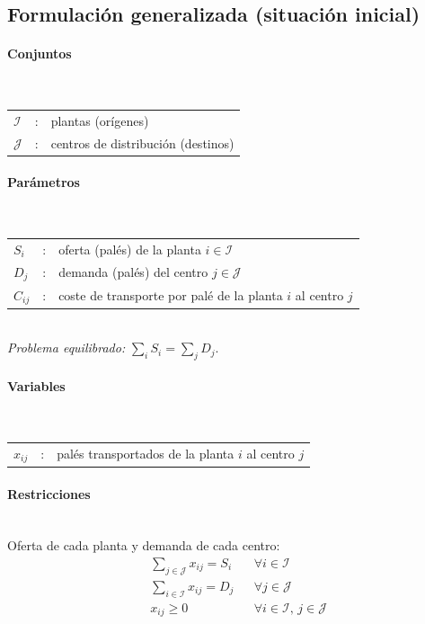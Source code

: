 \subsection{Formulación generalizada (situación inicial)}

\paragraph{Conjuntos}\mbox{}\\
\begin{tabular}{l c l}
    $\mathcal{I}$ & : & plantas (orígenes) \\
    $\mathcal{J}$ & : & centros de distribución (destinos) \\
\end{tabular}

\paragraph{Parámetros}\mbox{}\\
\begin{tabular}{l c l}
    $S_i$    & : & oferta (palés) de la planta $i \in \mathcal{I}$ \\
    $D_j$    & : & demanda (palés) del centro $j \in \mathcal{J}$ \\
    $C_{ij}$ & : & coste de transporte por palé de la planta $i$ al centro $j$ \\
\end{tabular}
\\[2pt]
\textit{Problema equilibrado: } $\sum_{i} S_i = \sum_{j} D_j$.

\paragraph{Variables}\mbox{}\\
\begin{tabular}{l c l}
    $x_{ij}$ & : & palés transportados de la planta $i$ al centro $j$ \\
\end{tabular}

\paragraph{Restricciones}\mbox{}\\
Oferta de cada planta y demanda de cada centro:
\begin{align}
    & \sum_{j \in \mathcal{J}} x_{ij} = S_i && \forall i \in \mathcal{I} \\
    & \sum_{i \in \mathcal{I}} x_{ij} = D_j && \forall j \in \mathcal{J} \\
    & x_{ij} \geq 0 && \forall i \in \mathcal{I},\, j \in \mathcal{J}
\end{align}

